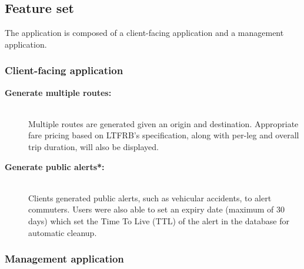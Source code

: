 \documentclass[journal]{./IEEE/IEEEtran}
\begin{document}
\subsection{Feature set}
The application is composed of a client-facing application and a management application. \hfill \\

\subsubsection{\textbf{Client-facing application}}

\begin{description}

    \item[\textbf{Generate multiple routes:}] \hfill \\
        Multiple routes are generated given an origin and destination. Appropriate fare pricing based on LTFRB's specification, along with per-leg and overall trip duration, will also be displayed.

    \item[\textbf{Generate public alerts*:}] \hfill \\
        Clients generated public alerts, such as vehicular accidents, to alert commuters. Users were also able to set an expiry date (maximum of 30 days) which set the Time To Live (TTL) of the alert in the database for automatic cleanup.

\end{description}

\subsubsection{\textbf{Management application}}
\end{document}
